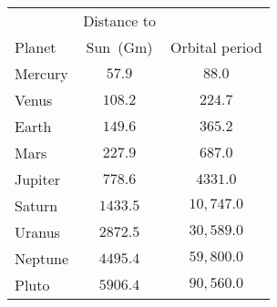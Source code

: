 \begin{tabular}{lcc} \toprule
        & Distance to \\
Planet  & Sun~(Gm) & Orbital period \\\midrule
Mercury & $57.9$   & $88.0$     \\
Venus   & $108.2$  & $224.7$    \\
Earth   & $149.6$  & $365.2$    \\
Mars    & $227.9$  & $687.0$    \\
Jupiter & $778.6$  & $4331.0$   \\
Saturn  & $1433.5$ & $10,747.0$ \\
Uranus  & $2872.5$ & $30,589.0$ \\
Neptune & $4495.4$ & $59,800.0$ \\
Pluto   & $5906.4$ & $90,560.0$ \\\bottomrule
\end{tabular}
